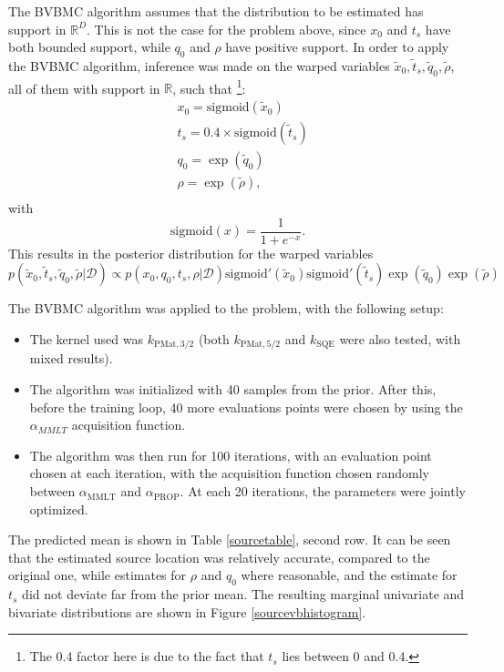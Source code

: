 The BVBMC algorithm assumes that the distribution to be estimated has support in $\mathbb{R}^D$. This is not the case for the problem above, since $x_0$ and $t_s$ have both bounded support, while $q_0$ and $\rho$ have positive support. In order to apply the BVBMC algorithm, inference was made on the warped variables $\tilde{x}_0,\tilde{t}_s,\tilde{q}_0,\tilde{\rho}$, all of them with support in $\mathbb{R}$, such that  \footnote{The 0.4 factor here is due to the fact that $t_s$ lies between 0 and 0.4.}:
\begin{equation}
\begin{split}
 & x_0 = \text{sigmoid}(\tilde{x}_0) \\
 & t_s = 0.4 \times \text{sigmoid}(\tilde{t}_s)  \\
 & q_0 = \exp(\tilde{q}_0) \\
 & \rho = \exp(\tilde{\rho}), \\
\end{split}
\end{equation}
with
\begin{equation}
\text{sigmoid}(x) = \frac{1}{1+e^{-x}}.
\end{equation}
This results in the posterior distribution for the warped variables
\begin{equation}
 p(\tilde{x}_0,\tilde{t}_s,\tilde{q}_0,\tilde{\rho}|\mathcal{D}) \propto p(x_0,q_0,t_s,\rho|\mathcal{D}) \text{sigmoid}'(\tilde{x}_0) \text{sigmoid}'(\tilde{t}_s) \exp(\tilde{q}_0) \exp(\tilde{\rho})
\end{equation}

The BVBMC algorithm was applied to the problem, with the following setup:
\begin{itemize}
	\item The kernel used was $k_{\text{PMat},3/2}$ (both $k_{\text{PMat},5/2}$ and $k_{\text{SQE}}$ were also tested, with mixed results).
	\item The algorithm was initialized with 40 samples from the prior. After this, before the training loop, 40 more evaluations points were chosen by using the $\alpha_{MMLT}$ acquisition function.
	\item The algorithm was then run for 100 iterations, with an evaluation point chosen at each iteration, with the acquisition function chosen randomly between $\alpha_\text{{MMLT}}$ and $\alpha_\text{{PROP}}$. At each 20 iterations, the parameters were jointly optimized.
\end{itemize}

The predicted mean is shown in Table \ref{sourcetable}, second row. It can be seen that the estimated source location was relatively accurate, compared to the original one, while estimates for $\rho$ and $q_0$ where reasonable, and the estimate for $t_s$ did not deviate far from the prior mean. The resulting marginal univariate and bivariate distributions are shown in Figure \ref{sourcevbhistogram}.

